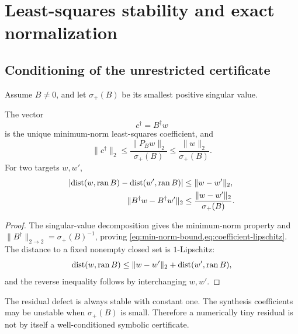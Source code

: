 \section{Least-squares stability and exact normalization}
\label{sec:stability-normalization}

\subsection{Conditioning of the unrestricted certificate}

Assume \(B\ne0\), and let \(\sigma_+(B)\) be its smallest positive
singular value.

\begin{proposition}
\label{prop:least-squares-stability}
The vector
\[
 c^\dagger=B^\dagger w
\]
is the unique minimum-norm least-squares coefficient, and
\begin{equation}
 \|c^\dagger\|_2
 \le
 \frac{\|P_Bw\|_2}{\sigma_+(B)}
 \le
 \frac{\|w\|_2}{\sigma_+(B)}.
 \label{eq:min-norm-bound}
\end{equation}
For two targets \(w,w'\),
\begin{align}
 \left|
 \operatorname{dist}(w,\operatorname{ran} B)-\operatorname{dist}(w',\operatorname{ran} B)
 \right|
 &\le\|w-w'\|_2,
 \label{eq:residual-lipschitz}\\
 \|B^\dagger w-B^\dagger w'\|_2
 &\le
 \frac{\|w-w'\|_2}{\sigma_+(B)}.
 \label{eq:coefficient-lipschitz}
\end{align}
\end{proposition}

\begin{proof}
The singular-value decomposition gives the minimum-norm property and
\(\|B^\dagger\|_{2\to2}=\sigma_+(B)^{-1}\), proving
\cref{eq:min-norm-bound,eq:coefficient-lipschitz}.  The distance to a
fixed nonempty closed set is \(1\)-Lipschitz:
\[
 \operatorname{dist}(w,\operatorname{ran} B)
 \le
 \|w-w'\|_2+\operatorname{dist}(w',\operatorname{ran} B),
\]
and the reverse inequality follows by interchanging \(w,w'\).
\end{proof}

\begin{remark}
The residual defect is always stable with constant one.  The
synthesis coefficients may be unstable when
\(\sigma_+(B)\) is small.  Therefore a numerically tiny residual is
not by itself a well-conditioned symbolic certificate.
\end{remark}

